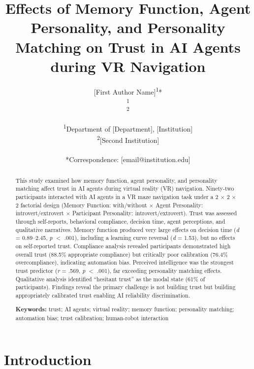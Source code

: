 \documentclass[12pt]{article}
\title{\textbf{Effects of Memory Function, Agent Personality, and Personality Matching on Trust in AI Agents during VR Navigation}}
\author{
[First Author Name]\textsuperscript{1}* \\
[Second Author Name]\textsuperscript{1} \\
[Third Author Name]\textsuperscript{2} \\
\\
\small{\textsuperscript{1}Department of [Department], [Institution]} \\
\small{\textsuperscript{2}[Second Institution]} \\
\\
\small{*Correspondence: [email@institution.edu]}
}
\date{}
\begin{document}

\maketitle

\begin{abstract}
\noindent This study examined how memory function, agent personality, and personality matching affect trust in AI agents during virtual reality (VR) navigation. Ninety-two participants interacted with AI agents in a VR maze navigation task under a 2 $\times$ 2 $\times$ 2 factorial design (Memory Function: with/without $\times$ Agent Personality: introvert/extrovert $\times$ Participant Personality: introvert/extrovert). Trust was assessed through self-reports, behavioral compliance, decision time, agent perceptions, and qualitative narratives. Memory function produced very large effects on decision time (\textit{d} = 0.89--2.45, \textit{p} $<$ .001), including a learning curve reversal (\textit{d} = 1.53), but no effects on self-reported trust. Compliance analysis revealed participants demonstrated high overall trust (88.5\% appropriate compliance) but critically poor calibration (76.4\% overcompliance), indicating automation bias. Perceived intelligence was the strongest trust predictor (\textit{r} = .569, \textit{p} $<$ .001), far exceeding personality matching effects. Qualitative analysis identified ``hesitant trust'' as the modal state (61\% of participants). Findings reveal the primary challenge is not building trust but building appropriately calibrated trust enabling AI reliability discrimination.

\vspace{0.3cm}
\noindent\textbf{Keywords:} trust; AI agents; virtual reality; memory function; personality matching; automation bias; trust calibration; human-robot interaction
\end{abstract}

\newpage

\section{Introduction}
\end{document}
